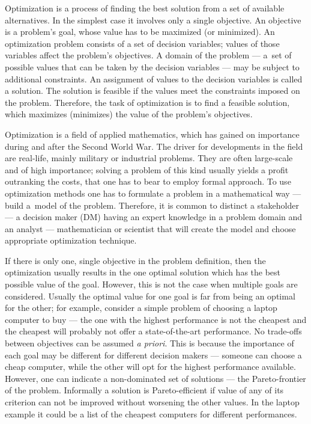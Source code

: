 Optimization is a process of finding the best solution from a set of available
alternatives. In the simplest case it involves only a single objective. An
objective is a problem's goal, whose value has to be maximized (or
minimized). An optimization problem consists of a set of decision variables;
values of those variables affect the problem's objectives. A domain of the
problem --- a~set of possible values that can be taken by the decision
variables --- may be subject to additional constraints. An assignment of
values to the decision variables is called a solution. The solution is
feasible if the values meet the constraints imposed on the problem. Therefore,
the task of optimization is to find a feasible solution, which maximizes
(minimizes) the value of the problem's objectives.

Optimization is a field of applied mathematics, which has gained on importance
during and after the Second World War. The driver for developments in the
field are real-life, mainly military or industrial problems. They are often
large-scale and of high importance; solving a problem of this kind usually
yields a profit outranking the costs, that one has to bear to employ formal
approach. To use optimization methods one has to formulate a problem in a
mathematical way --- build a~model of the problem. Therefore, it is common to
distinct a stakeholder --- a decision maker (DM) having an expert knowledge in
a problem domain and an analyst --- mathematician or scientist that will
create the model and choose appropriate optimization technique.

If there is only one, single objective in the problem definition, then the
optimization usually results in the one optimal solution which has the best
possible value of the goal. However, this is not the case when multiple goals
are considered. Usually the optimal value for one goal is far from being an
optimal for the other; for example, consider a simple problem of choosing a
laptop computer to buy --- the one with the highest performance is not the
cheapest and the cheapest will probably not offer a state-of-the-art
performance. No trade-offs between objectives can be assumed \textit{a
  priori}. This is because the importance of each goal may be different for
different decision makers --- someone can choose a cheap computer, while the
other will opt for the highest performance available. However, one can
indicate a non-dominated set of solutions --- the Pareto-frontier of the
problem. Informally a solution is Pareto-efficient if value of any of its
criterion can not be improved without worsening the other values. In the
laptop example it could be a list of the cheapest computers for different
performances.


